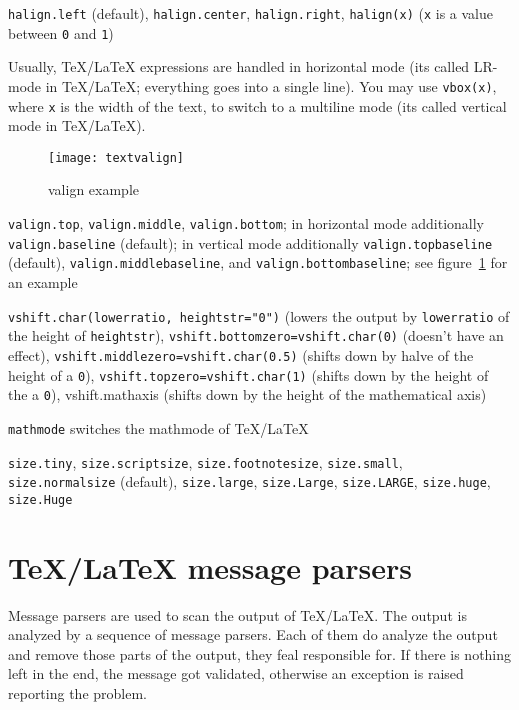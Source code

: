 \begin{description}
\raggedright
\item[Horizontal alignment:] \verb|halign.left| (default),
\verb|halign.center|, \verb|halign.right|, \verb|halign(x)| (\verb|x|
is a value between \verb|0| and \verb|1|)
\item[Vertical box:] Usually, \TeX/\LaTeX{} expressions are handled in
horizontal mode (its called LR-mode in \TeX/\LaTeX; everything goes
into a single line). You may use \verb|vbox(x)|, where \verb|x| is the
width of the text, to switch to a multiline mode (its called vertical
mode in \TeX/\LaTeX).
\begin{figure}
\centerline{\texttt{[image: textvalign]}}
\caption{valign example}
\label{fig:textvalign}
\end{figure}
\item[Vertical alignment:] \verb|valign.top|, \verb|valign.middle|,
\verb|valign.bottom|; in horizontal mode additionally
\verb|valign.baseline| (default); in vertical mode additionally
\verb|valign.topbaseline| (default), \verb|valign.middlebaseline|, and
\verb|valign.bottombaseline|; see figure~\ref{fig:textvalign} for an
example
\item[Vertical shift:] \verb|vshift.char(lowerratio, heightstr="0")|
(lowers the output by \verb|lowerratio| of the height of
\verb|heightstr|), \verb|vshift.bottomzero=vshift.char(0)| (doesn't
have an effect), \verb|vshift.middlezero=vshift.char(0.5)| (shifts
down by halve of the height of a \verb|0|),
\verb|vshift.topzero=vshift.char(1)| (shifts down by the height of the a
\verb|0|), vshift.mathaxis (shifts down by the height of the
mathematical axis)
\item[Mathmode:] \verb|mathmode| switches the mathmode of \TeX/\LaTeX
\item[Font size:] \verb|size.tiny|, \verb|size.scriptsize|,
\verb|size.footnotesize|, \verb|size.small|, \verb|size.normalsize|
(default), \verb|size.large|, \verb|size.Large|, \verb|size.LARGE|,
\verb|size.huge|, \verb|size.Huge|
\end{description}

\section{\TeX/\LaTeX{} message parsers}

Message parsers are used to scan the output of \TeX/\LaTeX. The output
is analyzed by a sequence of message parsers. Each of them do analyze
the output and remove those parts of the output, they feal responsible
for. If there is nothing left in the end, the message got validated,
otherwise an exception is raised reporting the problem.

